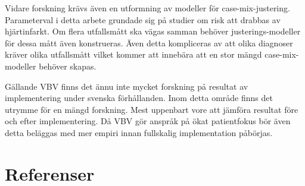 Vidare forskning krävs även en utformning av modeller för case-mix-justering. Parameterval i detta arbete grundade sig på studier om risk att drabbas av hjärtinfarkt. Om flera utfallsmått ska vägas samman behöver justerings-modeller för dessa mått även konstrueras. Även detta kompliceras av att olika diagnoser kräver olika utfallsmått vilket kommer att innebära att en stor mängd case-mix-modeller behöver skapas.

Gällande VBV finns det ännu inte mycket forskning på resultat av implementering under svenska förhållanden. Inom detta område finns det utrymme för en mängd forskning. Mest uppenbart vore att jämföra resultat före och efter implementering. Då VBV gör anspråk på ökat patientfokus bör även detta beläggas med mer empiri innan fullskalig implementation påbörjas.

\section{Referenser}

